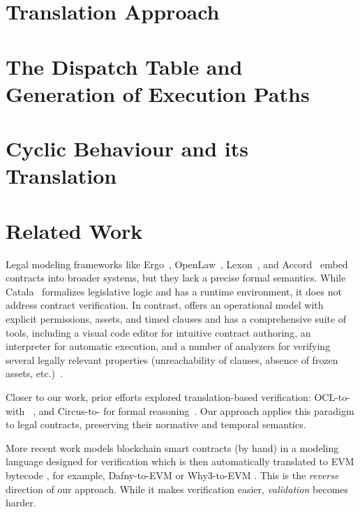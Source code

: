 \documentclass[runningheads]{llncs}
\begin{document}
\section{Translation Approach}
\label{sec:translation}


\section{The Dispatch Table and Generation of Execution Paths}
\label{sec:dispatchtable}


\section{Cyclic Behaviour and its Translation}
\label{sec:cyclic-behavior}


%
\section{Related Work}
\label{sec:relatedworks}

Legal modeling frameworks like Ergo~\cite{ergo},
OpenLaw~\cite{OpenLaw}, Lexon~\cite{Lexon}, and Accord~\cite{Accord}
embed contracts into broader systems, but they lack a precise formal
semantics. While Catala~\cite{Catala} formalizes legislative logic and
has a runtime environment, it does not address contract
verification. In contrast, {\Stipula} offers an operational model with
explicit permissions, assets, and timed clauses and has a
comprehensive suite of tools, including a visual code editor for
intuitive contract authoring, an interpreter for automatic execution,
and a number of analyzers for verifying several legally relevant
properties (unreachability of clauses, absence of frozen assets,
etc.)~\cite{Laneve2026}.

Closer to our work, prior efforts explored translation-based
verification: OCL-to-{\Java} with {\JML}~\cite{hamie2002ocl}, and
Circus-to-{\Java} for formal reasoning~\cite{DBLP:conf/fm/FreitasC06}.
Our approach applies this paradigm to legal contracts, preserving
their normative and temporal semantics.

More recent work models blockchain smart contracts (by hand) in a
modeling language designed for verification which is then
automatically translated to EVM bytecode \cite{Solidity}, for example,
Dafny-to-EVM \cite{Dafny24} or Why3-to-EVM \cite{Why319}. This is the
\emph{reverse} direction of our approach. While it makes verification
easier, \emph{validation} becomes harder.
\end{document}
